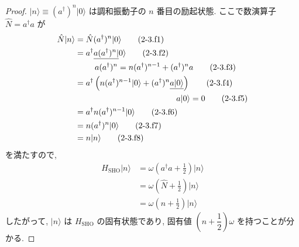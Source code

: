 \documentclass[a4paper,12pt]{article}
\begin{document}
\begin{proof}
$\lvert n \rangle \equiv (a^\dagger)^n \lvert 0 \rangle$ は調和振動子の $n$ 番目の励起状態. ここで数演算子 $\hat{N} = a^\dagger a$ が
\begin{align*}
    \hat{N} \lvert n \rangle &= \hat{N} (a^\dagger)^n \lvert 0 \rangle \tag{2-3.f1} \\
    &= a^\dagger \underline{a (a^\dagger)^n \lvert} 0 \rangle \tag{2-3.f2} \\
    &\quad \hspace{0.5cm} a(a^\dagger)^n = n(a^\dagger)^{n-1} + (a^\dagger)^n a \label{2-3.f3} \tag{2-3.f3} \\
    &= a^\dagger \left( n(a^\dagger)^{n-1} \lvert 0 \rangle + (a^\dagger)^n \underline{a \lvert 0 \rangle} \right) \tag{2-3.f4} \\
    &\quad \hspace{4cm} a \lvert 0 \rangle = 0 \tag{2-3.f5}\\
    &= a^\dagger n (a^\dagger)^{n-1} \lvert 0 \rangle \tag{2-3.f6} \\
    &= n (a^\dagger)^n \lvert 0 \rangle \tag{2-3.f7}\\
    &= n \lvert n \rangle \tag{2-3.f8}
\end{align*}
を満たすので,
\begin{align*}
    H_{\text{SHO}} \lvert n \rangle &= \omega \left( a^\dagger a + \frac{1}{2} \right) \lvert n \rangle \tag{2-3.f9} \\
    &= \omega \left( \hat{N} + \frac{1}{2} \right) \lvert n \rangle \tag{2-3.f10} \\
    &= \omega \left( n + \frac{1}{2} \right) \lvert n \rangle \tag{2-3.f11}
\end{align*}
したがって, $\lvert n \rangle$ は $H_{\text{SHO}}$ の固有状態であり, 固有値 $\left(n + \dfrac{1}{2}\right)\omega$ を持つことが分かる.

\end{proof}
\end{document}
